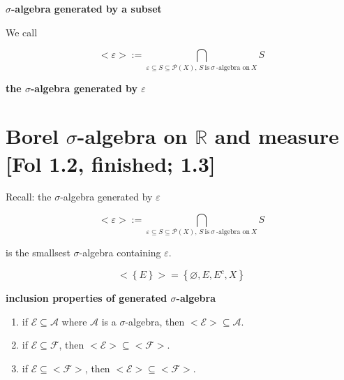 \documentclass{qlnotes-export}
\begin{document}
\begin{definition}{\protect{}\label{kn-sigma-algebra-generated-by-a-subset}{\textbf{\(\sigma\)-algebra
generated by a subset}}}

We call

\[< \varepsilon > := \bigcap\limits_{\varepsilon \subseteq S \subseteq \mathcal{P}(X),\, S\ \text{is}\ \sigma\ \text{-algebra on}\ X}S\]

\textbf{the \(\sigma\)-algebra generated by \(\varepsilon\)}

\end{definition}

\section{\texorpdfstring{Borel \(\sigma\)-algebra on \(\mathbb{R}\) and measure {[}Fol 1.2, finished; 1.3{]}}{Borel \textbackslash sigma-algebra on \textbackslash mathbb\{R\} and measure {[}Fol 1.2, finished; 1.3{]}}}

Recall: the \(\sigma\)-algebra generated by \(\varepsilon\)

\[< \varepsilon > := \bigcap\limits_{\varepsilon \subseteq S \subseteq \mathcal{P}(X),\, S\ \text{is}\ \sigma\ \text{-algebra on}\ X}S\]

is the smallsest \(\sigma\)-algebra containing \(\varepsilon\).

\begin{example}

\[< \left\{ E \right\} > = \left\{ {\varnothing,E,E^{c},X} \right\}\]

\end{example}

\begin{lemma}{\protect{}\label{kn-inclusion-properties-of-generated-sigma-algebra}{\textbf{inclusion
properties of generated \(\sigma\)-algebra}}}\label{lem-01-sigma-algebra-measure-inclusion-properties-of-generated-sigma-algebra}

\begin{enumerate}
\item
  if \(\mathcal{E} \subseteq \mathcal{A}\) where \(\mathcal{A}\) is a \(\sigma\)-algebra, then \(< \mathcal{E} > \subseteq \mathcal{A}\).
\item
  if \(\mathcal{E} \subseteq \mathcal{F}\), then \(< \mathcal{E} > \subseteq < \mathcal{F} >\).
\item
  if \(\mathcal{E} \subseteq < \mathcal{F} >\), then \(< \mathcal{E} > \subseteq < \mathcal{F} >\).
\end{enumerate}

\end{lemma}
\end{document}
